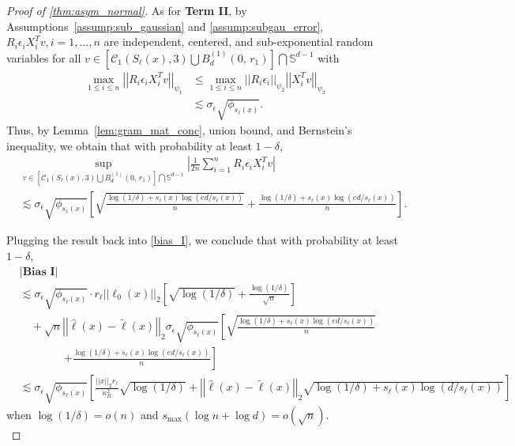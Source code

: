 \documentclass[ejsv2,noshowframe]{imsart}
\theoremstyle{plain}
\theoremstyle{definition}
\theoremstyle{remark}
\newcommand{\norm}[1]{\left|\left| #1 \right|\right|}
\renewcommand{\hat}{\widehat}
\renewcommand{\tilde}{\widetilde}
\begin{document}
\begin{proof}[Proof of \autoref{thm:asym_normal}]
	As for \textbf{Term II}, by Assumptions~\ref{assump:sub_gaussian} and \ref{assump:subgau_error}, $R_i\epsilon_i X_i^Tv, i=1,...,n$ are independent, centered, and sub-exponential random variables for all $v\in \left[\mathcal{C}_1(S_{\ell}(x),3) \bigcup B_d^{(1)}\left(0,\, r_1\right)\right] \bigcap \mathbb{S}^{d-1}$ with
	\begin{align*}
		\max_{1\leq i \leq n} \norm{R_i\epsilon_i X_i^Tv}_{\psi_1} &\leq \max_{1\leq i \leq n} \norm{R_i\epsilon_i}_{\psi_2} \norm{X_i^Tv}_{\psi_2}\\
		&\lesssim \sigma_{\epsilon} \sqrt{\phi_{s_{\ell}(x)}}.
	\end{align*}
	Thus, by Lemma~\ref{lem:gram_mat_conc}, union bound, and Bernstein's inequality, we obtain that with probability at least $1-\delta$,
	\begin{align*}
		&\sup_{v \in \left[\mathcal{C}_1(S_{\ell}(x),3) \bigcup B_d^{(1)}\left(0,\, r_1\right)\right] \bigcap \mathbb{S}^{d-1}} \left|\frac{1}{2n} \sum_{i=1}^n R_i\epsilon_i X_i^Tv \right| \\
		&\lesssim \sigma_{\epsilon} \sqrt{\phi_{s_{\ell}(x)}} \left[\sqrt{\frac{\log(1/\delta) + s_{\ell}(x) \log(ed/s_{\ell}(x))}{n}} + \frac{\log(1/\delta) + s_{\ell}(x) \log(ed/s_{\ell}(x))}{n} \right].
	\end{align*}
	
	Plugging the result back into \eqref{bias_I}, we conclude that with probability at least $1-\delta$,
	\begin{align*}
		&\left|\textbf{Bias I}\right| \\
		&\lesssim \sigma_{\epsilon} \sqrt{\phi_{s_{\ell}(x)}} \cdot r_{\ell} \norm{\ell_0(x)}_2 \left[\sqrt{\log(1/\delta)} + \frac{\log(1/\delta)}{\sqrt{n}} \right]\\
		&\quad + \sqrt{n} \norm{\hat{\ell}(x) -\tilde{\ell}(x)}_2 \sigma_{\epsilon} \sqrt{\phi_{s_{\ell}(x)}} \left[\sqrt{\frac{\log(1/\delta) + s_{\ell}(x) \log(ed/s_{\ell}(x))}{n}} \right. \\
		&\quad \quad\quad \quad  \left.+ \frac{\log(1/\delta) + s_{\ell}(x) \log(ed/s_{\ell}(x))}{n} \right]\\
		&\lesssim \sigma_{\epsilon} \sqrt{\phi_{s_{\ell}(x)}}\left[\frac{\norm{x}_2 r_{\ell}}{\kappa_R^2} \sqrt{\log(1/\delta)} + \norm{\hat{\ell}(x) - \tilde{\ell}(x)}_2 \sqrt{\log(1/\delta) + s_{\ell}(x) \log(d/s_{\ell}(x))}\right] 
	\end{align*}
	when $\log(1/\delta) =o(n)$ and $s_{\max}\left(\log n + \log d\right) = o(\sqrt{n})$.\\
	

\end{proof}
\end{document}
